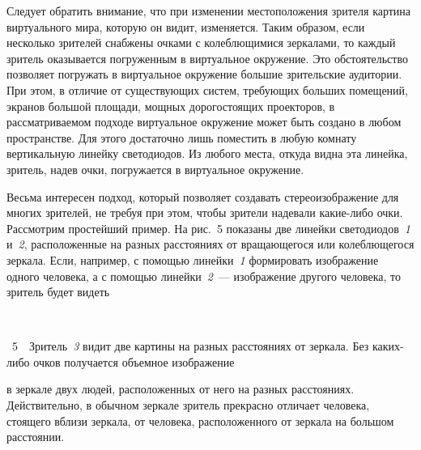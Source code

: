 \begin{multicols}{2}
  
  Следует обратить внимание, что при изменении местоположения зрителя картина 
виртуального мира, которую он видит, изменяется. Таким образом, если несколько 
зрителей снабжены очками с колеблющимися зеркалами, то каждый зритель оказывается 
погруженным в виртуальное окружение. Это обстоятельство позволяет погружать в 
виртуальное окружение большие зрительские аудитории. При этом, в отличие от 
существующих систем, требующих больших помещений, экранов большой площади, 
мощных дорогостоящих проекторов, в рассматриваемом подходе виртуальное окружение 
может быть создано в любом пространстве. Для этого достаточно лишь поместить в 
любую комнату вертикальную линейку светодиодов. Из любого мес\-та, откуда видна эта 
линейка, зритель, надев очки, погружается в виртуальное окружение. 
  

  
  
  Весьма интересен подход, который позволяет создавать стереоизображение для многих 
зрителей, не требуя при этом, чтобы зрители надевали какие-либо очки. Рассмотрим 
простейший пример. На рис.~5 %
показаны две линейки светодиодов~\textit{1} 
и~\textit{2}, расположенные на разных расстояниях от вращающегося или колеблющегося 
зеркала. Если, например, с помощью линейки~\textit{1} формировать изображение одного 
человека, а с помощью линейки~\textit{2}~--- изоб\-ра\-же\-ние другого человека, то зритель 
будет видеть\linebreak


\begin{center}
\mbox{%
\epsfxsize=38.754mm
}
\end{center}
{{\figurename~5}\ \ \small{Зритель~\textit{3} видит две картины на разных расстояниях от зеркала. Без каких-либо очков 
получается объемное изображение}}


\bigskip
\addtocounter{figure}{1}  

\noindent
 в зеркале двух людей, расположенных от него на разных расстояниях. 
Действительно, в обычном зеркале зритель прекрасно отличает человека, стоящего вблизи 
зеркала, от человека, расположенного от зеркала на большом расстоянии. 
     \begin{figure*}[b] %
\begin{center}
\mbox{%
\epsfxsize=145.268mm
}
\end{center}
\vspace*{-9pt}
   \end{figure*}


\end{multicols}
